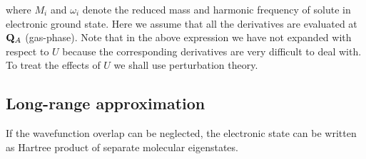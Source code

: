 %
where $M_i$ and $\omega_i$ denote the reduced mass and harmonic
frequency of solute in electronic ground state. Here we assume that
all the derivatives are evaluated at ${\bf {Q}}_A$ (gas\hyp{}phase).
Note that in the above expression we have not expanded with respect to
$U$ because the corresponding derivatives are very difficult to deal with.
To treat the effects of $U$ we shall use perturbation theory.

\subsection{Long-range approximation}

If the wavefunction overlap can be neglected, the electronic state
can be written as Hartree product of separate molecular eigenstates.

